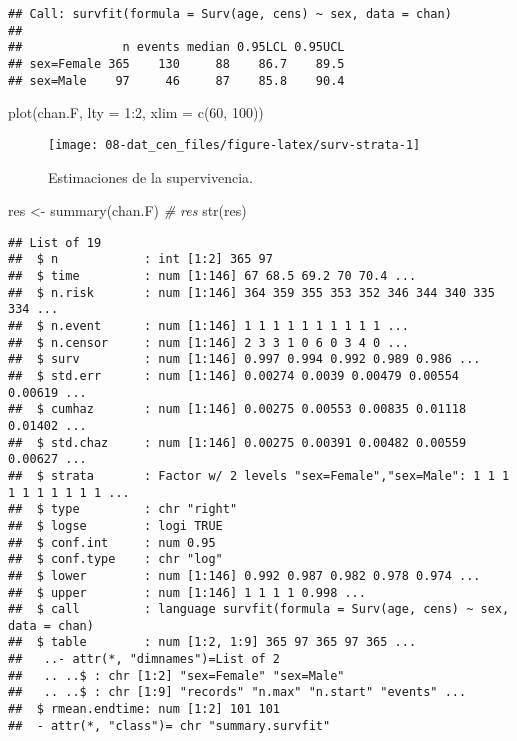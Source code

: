 \documentclass[
]{book}
\newenvironment{Shaded}{\begin{snugshade}}{\end{snugshade}}
\newcommand{\AttributeTok}[1]{\textcolor[rgb]{0.77,0.63,0.00}{#1}}
\newcommand{\CommentTok}[1]{\textcolor[rgb]{0.56,0.35,0.01}{\textit{#1}}}
\newcommand{\DecValTok}[1]{\textcolor[rgb]{0.00,0.00,0.81}{#1}}
\newcommand{\FunctionTok}[1]{\textcolor[rgb]{0.00,0.00,0.00}{#1}}
\newcommand{\NormalTok}[1]{#1}
\newcommand{\OtherTok}[1]{\textcolor[rgb]{0.56,0.35,0.01}{#1}}
\newcommand{\SpecialCharTok}[1]{\textcolor[rgb]{0.00,0.00,0.00}{#1}}
\theoremstyle{break}
\theoremstyle{definition}
\theoremstyle{definition}
\theoremstyle{definition}
\theoremstyle{definition}
\theoremstyle{remark}
\begin{document}
\begin{verbatim}
## Call: survfit(formula = Surv(age, cens) ~ sex, data = chan)
## 
##              n events median 0.95LCL 0.95UCL
## sex=Female 365    130     88    86.7    89.5
## sex=Male    97     46     87    85.8    90.4
\end{verbatim}

\begin{Shaded}
\begin{Highlighting}[]
\FunctionTok{plot}\NormalTok{(chan.F, }\AttributeTok{lty =} \DecValTok{1}\SpecialCharTok{:}\DecValTok{2}\NormalTok{, }\AttributeTok{xlim =} \FunctionTok{c}\NormalTok{(}\DecValTok{60}\NormalTok{, }\DecValTok{100}\NormalTok{))}
\end{Highlighting}
\end{Shaded}

\begin{figure}[!htb]

{\centering \texttt{[image: 08-dat\_cen\_files/figure-latex/surv-strata-1]} 

}

\caption{Estimaciones de la supervivencia.}\label{fig:surv-strata}
\end{figure}

\begin{Shaded}
\begin{Highlighting}[]
\NormalTok{res }\OtherTok{\textless{}{-}} \FunctionTok{summary}\NormalTok{(chan.F)}
\CommentTok{\# res}
\FunctionTok{str}\NormalTok{(res)}
\end{Highlighting}
\end{Shaded}

\begin{verbatim}
## List of 19
##  $ n            : int [1:2] 365 97
##  $ time         : num [1:146] 67 68.5 69.2 70 70.4 ...
##  $ n.risk       : num [1:146] 364 359 355 353 352 346 344 340 335 334 ...
##  $ n.event      : num [1:146] 1 1 1 1 1 1 1 1 1 1 ...
##  $ n.censor     : num [1:146] 2 3 3 1 0 6 0 3 4 0 ...
##  $ surv         : num [1:146] 0.997 0.994 0.992 0.989 0.986 ...
##  $ std.err      : num [1:146] 0.00274 0.0039 0.00479 0.00554 0.00619 ...
##  $ cumhaz       : num [1:146] 0.00275 0.00553 0.00835 0.01118 0.01402 ...
##  $ std.chaz     : num [1:146] 0.00275 0.00391 0.00482 0.00559 0.00627 ...
##  $ strata       : Factor w/ 2 levels "sex=Female","sex=Male": 1 1 1 1 1 1 1 1 1 1 ...
##  $ type         : chr "right"
##  $ logse        : logi TRUE
##  $ conf.int     : num 0.95
##  $ conf.type    : chr "log"
##  $ lower        : num [1:146] 0.992 0.987 0.982 0.978 0.974 ...
##  $ upper        : num [1:146] 1 1 1 1 0.998 ...
##  $ call         : language survfit(formula = Surv(age, cens) ~ sex, data = chan)
##  $ table        : num [1:2, 1:9] 365 97 365 97 365 ...
##   ..- attr(*, "dimnames")=List of 2
##   .. ..$ : chr [1:2] "sex=Female" "sex=Male"
##   .. ..$ : chr [1:9] "records" "n.max" "n.start" "events" ...
##  $ rmean.endtime: num [1:2] 101 101
##  - attr(*, "class")= chr "summary.survfit"
\end{verbatim}
\end{document}
